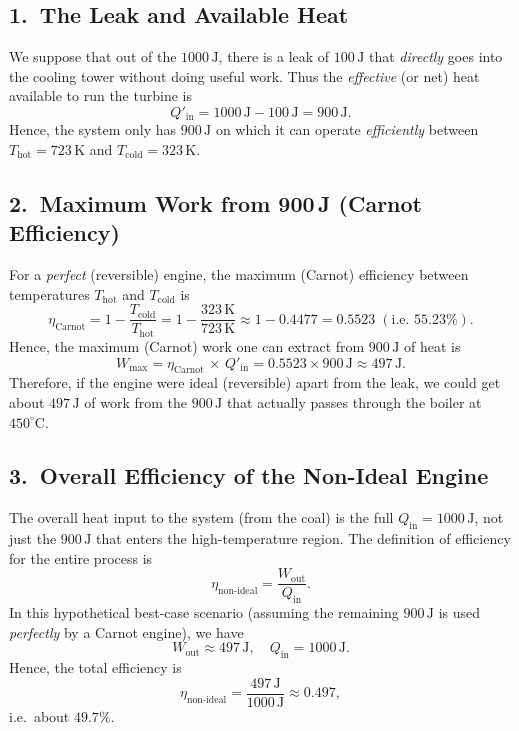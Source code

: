 \documentclass[12pt]{article}
\theoremstyle{definition} %
\theoremstyle{plain} %
\begin{document}
\subsection*{1.\ The Leak and Available Heat}

We suppose that out of the $1000\,\mathrm{J}$, there is a leak of $100\,\mathrm{J}$ that \emph{directly} goes into the cooling tower without doing useful work. Thus the \emph{effective} (or net) heat available to run the turbine is
\[
Q'_\mathrm{in} = 1000\,\mathrm{J} - 100\,\mathrm{J} = 900\,\mathrm{J}.
\]
Hence, the system only has $900\,\mathrm{J}$ on which it can operate \emph{efficiently} between $T_\mathrm{hot} = 723\,\mathrm{K}$ and $T_\mathrm{cold} = 323\,\mathrm{K}$.

\subsection*{2.\ Maximum Work from 900\,J (Carnot Efficiency)}

For a \emph{perfect} (reversible) engine, the maximum (Carnot) efficiency between temperatures $T_\mathrm{hot}$ and $T_\mathrm{cold}$ is
\[
\eta_\mathrm{Carnot} 
= 1 - \frac{T_\mathrm{cold}}{T_\mathrm{hot}} 
= 1 - \frac{323\,\mathrm{K}}{723\,\mathrm{K}}
\approx 1 - 0.4477
= 0.5523\; (\text{i.e.\ }55.23\%).
\]
Hence, the maximum (Carnot) work one can extract from $900\,\mathrm{J}$ of heat is
\[
W_\mathrm{max} 
= \eta_\mathrm{Carnot}\,\times\,Q'_\mathrm{in}
= 0.5523\times 900\,\mathrm{J}
\approx 497\,\mathrm{J}.
\]
Therefore, if the engine were ideal (reversible) apart from the leak, we could get about $497\,\mathrm{J}$ of work from the $900\,\mathrm{J}$ that actually passes through the boiler at $450^\circ\mathrm{C}$.

\subsection*{3.\ Overall Efficiency of the Non-Ideal Engine}

The overall heat input to the system (from the coal) is the full $Q_\mathrm{in} = 1000\,\mathrm{J}$, not just the $900\,\mathrm{J}$ that enters the high-temperature region. The definition of efficiency for the entire process is
\[
\eta_{\mathrm{non\text{-}ideal}}
= \frac{W_\mathrm{out}}{Q_\mathrm{in}}.
\]
In this hypothetical best-case scenario (assuming the remaining $900\,\mathrm{J}$ is used \emph{perfectly} by a Carnot engine), we have
\[
W_\mathrm{out} \approx 497\,\mathrm{J}, 
\quad
Q_\mathrm{in} = 1000\,\mathrm{J}.
\]
Hence, the total efficiency is
\[
\eta_{\mathrm{non\text{-}ideal}}
= \frac{497\,\mathrm{J}}{1000\,\mathrm{J}} \approx 0.497,
\]
i.e.\ about $49.7\%$.
\end{document}
